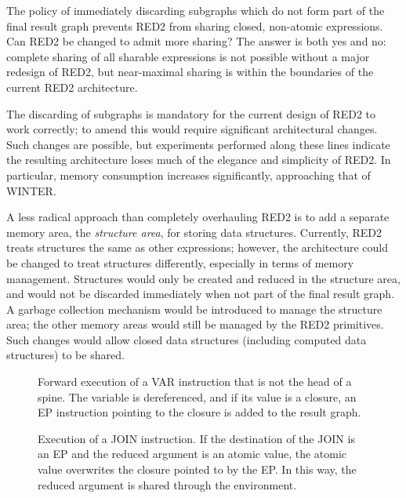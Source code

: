 The policy of immediately discarding subgraphs which do not form part of the
final result graph prevents RED2 from sharing closed, non-atomic expressions.
Can RED2 be changed to admit more sharing? The answer is both yes and no:
complete sharing of all sharable expressions is not possible without a major
redesign of RED2, but near-maximal sharing is within the boundaries of the
current RED2 architecture.

The discarding of subgraphs is mandatory for the current design of RED2 to work
correctly; to amend this would require significant architectural changes. Such
changes are possible, but experiments performed along these lines indicate the
resulting architecture loses much of the elegance and simplicity of RED2. In
particular, memory consumption increases significantly, approaching that of
WINTER.

A less radical approach than completely overhauling RED2 is to add a separate
memory area, the \emph{structure area}, for storing data structures. Currently, RED2
treats structures the same as other expressions; however, the architecture could
be changed to treat structures differently, especially in terms of memory
management. Structures would only be created and reduced in the structure area,
and would not be discarded immediately when not part of the final result graph.
A garbage collection mechanism would be introduced to manage the structure area;
the other memory areas would still be managed by the RED2 primitives. Such
changes would allow closed data structures (including computed data structures)
to be shared.

\begin{figure}[htbp]
\centering

\caption[Implementing sharing, Part 1]{Forward execution of a VAR instruction that is not the head of a
spine. The variable is dereferenced, and if its value is a closure, an EP
instruction pointing to the closure is added to the result graph.}
\end{figure}

\begin{figure}[htbp]
\centering

\caption[Implementing Sharing: Part 2]{Execution of a JOIN instruction. If the destination of the JOIN is an
EP and the reduced argument is an atomic value, the atomic value overwrites the
closure pointed to by the EP. In this way, the reduced argument is shared
through the environment.}
\end{figure}

